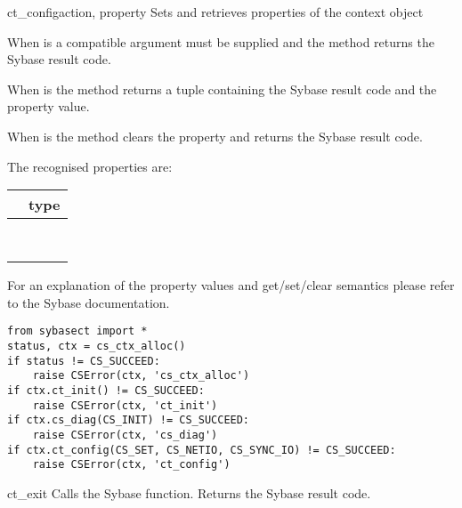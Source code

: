\begin{methoddesc}[CS_CONTEXT]{ct_config}{action, property }
Sets and retrieves properties of the context object

When  is  a compatible  argument
must be supplied and the method returns the Sybase result code.

When  is  the method returns a tuple
containing the Sybase result code and the property value.

When  is  the method clears the property
and returns the Sybase result code.

The recognised properties are:

\begin{longtable}{l|l}
\var{property} & type \\
\hline
\code{CS_LOGIN_TIMEOUT} & \code{int} \\
\code{CS_MAX_CONNECT}   & \code{int} \\
\code{CS_NETIO}         & \code{int} \\
\code{CS_NO_TRUNCATE}   & \code{int} \\
\code{CS_TEXTLIMIT}     & \code{int} \\
\code{CS_TIMEOUT}       & \code{int} \\
\code{CS_VER_STRING}    & \code{string} \\
\code{CS_VERSION}       & \code{string} \\
\end{longtable}

For an explanation of the property values and get/set/clear semantics
please refer to the Sybase documentation.

\begin{verbatim}
from sybasect import *
status, ctx = cs_ctx_alloc()
if status != CS_SUCCEED:
    raise CSError(ctx, 'cs_ctx_alloc')
if ctx.ct_init() != CS_SUCCEED:
    raise CSError(ctx, 'ct_init')
if ctx.cs_diag(CS_INIT) != CS_SUCCEED:
    raise CSError(ctx, 'cs_diag')
if ctx.ct_config(CS_SET, CS_NETIO, CS_SYNC_IO) != CS_SUCCEED:
    raise CSError(ctx, 'ct_config')
\end{verbatim}
\end{methoddesc}

\begin{methoddesc}[CS_CONTEXT]{ct_exit}{}
Calls the Sybase  function.  Returns the Sybase
result code.
\end{methoddesc}

